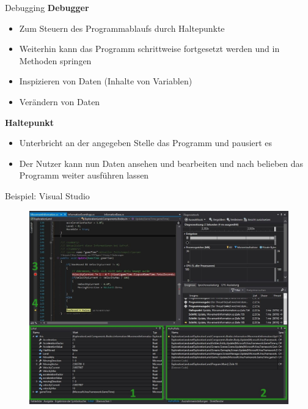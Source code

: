 \begin{frame}{Debugging}
	\textbf{Debugger}
	\begin{itemize}
		\item Zum Steuern des Programmablaufs durch Haltepunkte
		\item Weiterhin kann das Programm schrittweise fortgesetzt werden und in Methoden springen
		\item Inspizieren von Daten (Inhalte von Variablen)
		\item Verändern von Daten
	\end{itemize}
	\textbf{Haltepunkt}
	\begin{itemize}
		\item Unterbricht an der angegeben Stelle das Programm und pausiert es
		\item Der Nutzer kann nun Daten ansehen und bearbeiten und nach belieben das Programm weiter ausführen lassen		
	\end{itemize}
\end{frame}

\begin{frame}{Beispiel: Visual Studio}
	\begin{figure}
		\includegraphics[scale=0.322]{resources/02_grundlagen_2/debugger.JPG}
	\end{figure}
\end{frame}

